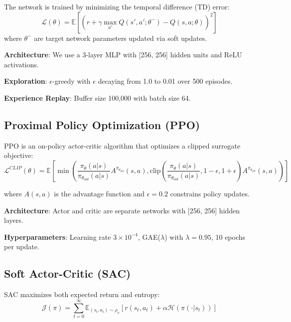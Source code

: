\documentclass[12pt]{article}
\begin{document}
The network is trained by minimizing the temporal difference (TD) error:
\begin{equation}
    \mathcal{L}(\theta) = \mathbb{E}\left[ \left( r + \gamma \max_{a'} Q(s', a'; \theta^-) - Q(s, a; \theta) \right)^2 \right]
\end{equation}
where $\theta^-$ are target network parameters updated via soft updates.

\textbf{Architecture}: We use a 3-layer MLP with [256, 256] hidden units and ReLU activations.

\textbf{Exploration}: $\epsilon$-greedy with $\epsilon$ decaying from 1.0 to 0.01 over 500 episodes.

\textbf{Experience Replay}: Buffer size 100,000 with batch size 64.

\subsection{Proximal Policy Optimization (PPO)}

PPO \citep{schulman2017} is an on-policy actor-critic algorithm that optimizes a clipped surrogate objective:
\begin{equation}
    \mathcal{L}^{CLIP}(\theta) = \mathbb{E}\left[ \min\left( \frac{\pi_\theta(a|s)}{\pi_{\theta_{old}}(a|s)} A^{\pi_{\theta_{old}}}(s,a), \text{clip}\left( \frac{\pi_\theta(a|s)}{\pi_{\theta_{old}}(a|s)}, 1-\epsilon, 1+\epsilon \right) A^{\pi_{\theta_{old}}}(s,a) \right) \right]
\end{equation}

where $A(s,a)$ is the advantage function and $\epsilon = 0.2$ constrains policy updates.

\textbf{Architecture}: Actor and critic are separate networks with [256, 256] hidden layers.

\textbf{Hyperparameters}: Learning rate $3 \times 10^{-4}$, GAE($\lambda$) with $\lambda = 0.95$, 10 epochs per update.

\subsection{Soft Actor-Critic (SAC)}

SAC \citep{haarnoja2018} maximizes both expected return and entropy:
\begin{equation}
    \mathcal{J}(\pi) = \sum_{t=0}^\infty \mathbb{E}_{(s_t, a_t) \sim \rho_\pi} \left[ r(s_t, a_t) + \alpha \mathcal{H}(\pi(\cdot | s_t)) \right]
\end{equation}
\end{document}
